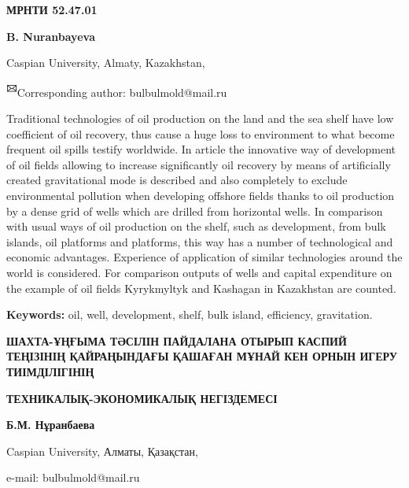 \newpage
{\bfseries МРНТИ 52.47.01}


\begin{center}
{\bfseries B. Nuranbayeva}

Caspian University, Almaty, Kazakhstan,

{\bfseries \textsuperscript{🖂}}Corresponding author: bulbulmold@mail.ru
\end{center}

Traditional technologies of oil production on the land and the sea shelf
have low coefficient of oil recovery, thus cause a huge loss to
environment to what become frequent oil spills testify worldwide. In
article the innovative way of development of oil fields allowing to
increase significantly oil recovery by means of artificially created
gravitational mode is described and also completely to exclude
environmental pollution when developing offshore fields thanks to oil
production by a dense grid of wells which are drilled from horizontal
wells. In comparison with usual ways of oil production on the shelf,
such as development, from bulk islands, oil platforms and platforms,
this way has a number of technological and economic advantages.
Experience of application of similar technologies around the world is
considered. For comparison outputs of wells and capital expenditure on
the example of oil fields Kyrykmyltyk and Kashagan in Kazakhstan are
counted.

{\bfseries Keywords:} oil, well, development, shelf, bulk island,
efficiency, gravitation.

\begin{center}
{\large\bfseries ШАХТА-ҰҢҒЫМА ТӘСІЛІН ПАЙДАЛАНА ОТЫРЫП КАСПИЙ ТЕҢІЗІНІҢ
ҚАЙРАҢЫНДАҒЫ ҚАШАҒАН МҰНАЙ КЕН ОРНЫН ИГЕРУ ТИІМДІЛІГІНІҢ}

{\bfseries ТЕХНИКАЛЫҚ-ЭКОНОМИКАЛЫҚ НЕГІЗДЕМЕСІ}

{\bfseries Б.М. Нұранбаева}

Caspian University, Алматы, Қазақстан,

e-mail: bulbulmold@mail.ru
\end{center}

